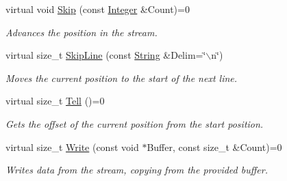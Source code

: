 \begin{DoxyCompactItemize}
virtual void \hyperlink{classMezzanine_1_1Resource_1_1DataStream_a5ba58755ae72eae04678c42e5e2c22b9}{Skip} (const \hyperlink{namespaceMezzanine_ac3576e52af3c62d13dde94829e0c5465}{Integer} \&Count)=0
\begin{DoxyCompactList}\small\item\em Advances the position in the stream. \item\end{DoxyCompactList}\item 
virtual size\_\-t \hyperlink{classMezzanine_1_1Resource_1_1DataStream_a8b55a5a1fc3ade2eeb5966a9563ec3ec}{SkipLine} (const \hyperlink{namespaceMezzanine_acf9fcc130e6ebf08e3d8491aebcf1c86}{String} \&Delim=\char`\"{}$\backslash$n\char`\"{})
\begin{DoxyCompactList}\small\item\em Moves the current position to the start of the next line. \item\end{DoxyCompactList}\item 
virtual size\_\-t \hyperlink{classMezzanine_1_1Resource_1_1DataStream_a0fa4e7d3297ffead34f4aed868dcb633}{Tell} ()=0
\begin{DoxyCompactList}\small\item\em Gets the offset of the current position from the start position. \item\end{DoxyCompactList}\item 
virtual size\_\-t \hyperlink{classMezzanine_1_1Resource_1_1DataStream_aafdbe4aeb8e8743d514fbd1075a30859}{Write} (const void $\ast$Buffer, const size\_\-t \&Count)=0
\begin{DoxyCompactList}\small\item\em Writes data from the stream, copying from the provided buffer. \item\end{DoxyCompactList}\end{DoxyCompactItemize}
